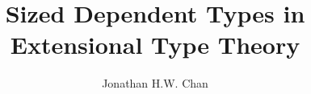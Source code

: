 \documentclass[oneside,onehalfspacing,11pt]{ubcdiss}
\title{Sized Dependent Types in Extensional Type Theory}
\author{Jonathan {\footnotesize H.W. \relax}Chan}
\begin{document}
\maketitle
\makecommitteepage
\textspacing





\tableofcontents
\listoftables
\listoffigures




\mainmatter
\setcounter{chapter}{-1}








\begin{singlespace}
\raggedright

\end{singlespace}

\appendix


\backmatter
\printindex
\end{document}
